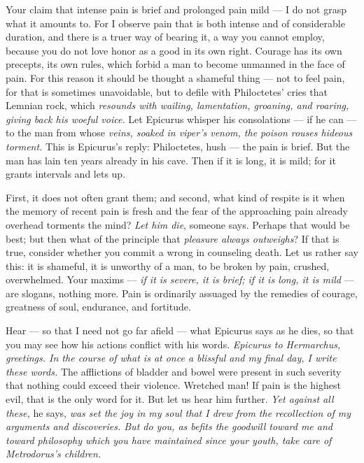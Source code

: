  Your claim that intense pain is brief and prolonged pain mild — I do not grasp what it amounts to. For I observe pain that is both intense and of considerable duration, and there is a truer way of bearing it, a way you cannot employ, because you do not love honor as a good in its own right. Courage has its own precepts, its own rules, which forbid a man to become unmanned in the face of pain. For this reason it should be thought a shameful thing — not to feel pain, for that is sometimes unavoidable, but to defile with Philoctetes' cries that Lemnian rock, which \textit{resounds with wailing, lamentation, groaning, and roaring, giving back his woeful voice.} Let Epicurus whisper his consolations — if he can — to the man from whose \textit{veins, soaked in viper's venom, the poison rouses hideous torment.} This is Epicurus's reply: Philoctetes, hush — the pain is brief. But the man has lain ten years already in his cave. Then if it is long, it is mild; for it grants intervals and lets up.

 First, it does not often grant them; and second, what kind of respite is it when the memory of recent pain is fresh and the fear of the approaching pain already overhead torments the mind? \textit{Let him die}, someone says. Perhaps that would be best; but then what of the principle that \textit{pleasure always outweighs}? If that is true, consider whether you commit a wrong in counseling death. Let us rather say this: it is shameful, it is unworthy of a man, to be broken by pain, crushed, overwhelmed. Your maxims — \textit{if it is severe, it is brief; if it is long, it is mild} — are slogans, nothing more. Pain is ordinarily assuaged by the remedies of courage, greatness of soul, endurance, and fortitude.

 Hear — so that I need not go far afield — what Epicurus says as he dies, so that you may see how his actions conflict with his words. \textit{Epicurus to Hermarchus, greetings. In the course of what is at once a blissful and my final day, I write these words.} The afflictions of bladder and bowel were present in such severity that nothing could exceed their violence. Wretched man! If pain is the highest evil, that is the only word for it. But let us hear him further. \textit{Yet against all these,} he says, \textit{was set the joy in my soul that I drew from the recollection of my arguments and discoveries. But do you, as befits the goodwill toward me and toward philosophy which you have maintained since your youth, take care of Metrodorus's children.}

